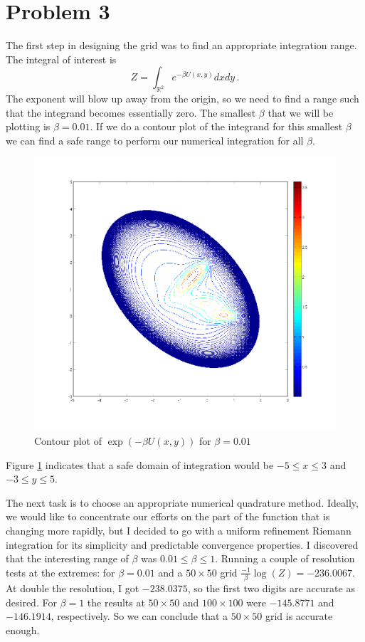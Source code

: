 \documentclass[letterpaper]{article}
\begin{document}
\section*{Problem 3}
The first step in designing the grid was to find an appropriate integration
range. The integral of interest is
\[
Z=\int_{\mathbb{R}^2}e^{-\beta U(x,y)}dxdy\,.
\]
The exponent will blow up away from the origin, so we need to find a range such
that the integrand becomes essentially zero. The smallest $\beta$ that we will
be plotting is $\beta=0.01$. If we do a contour plot of the integrand for this
smallest $\beta$ we can find a safe range to perform our numerical integration
for all $\beta$.
\begin{figure}[h]
\begin{center}
\includegraphics[width=5in,keepaspectratio]{Integrand.png}
\end{center}
\caption{Contour plot of $\exp(-\beta U(x,y))$ for $\beta=0.01$}
\label{fig:integrand}
\end{figure}
Figure \ref{fig:integrand} indicates that a safe domain of integration would be
$-5\le x\le 3$ and $-3\le y\le 5$.

The next task is to choose an appropriate numerical quadrature method. Ideally,
we would like to concentrate our efforts on the part of the function that is
changing more rapidly, but I decided to go with a uniform refinement Riemann
integration for its simplicity and predictable convergence properties. I
discovered that the interesting range of $\beta$ was $0.01\le\beta\le 1$.
Running a couple of resolution tests at the extremes: for $\beta=0.01$ and a
$50\times50$ grid $\frac{-1}{\beta}\log(Z)=-236.0067$. At double the resolution,
I got $-238.0375$, so the first two digits are accurate as desired. For
$\beta=1$ the results at $50\times50$ and $100\times100$ were $-145.8771$ and
$-146.1914$, respectively. So we can conclude that a $50\times50$ grid is
accurate enough.
\end{document}
